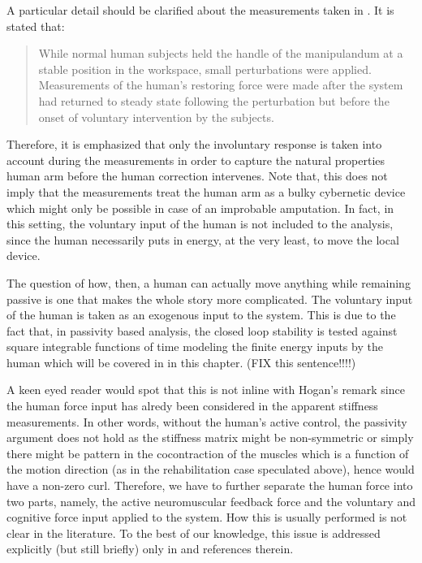 \begin{rem}
A particular detail should be clarified about the measurements taken in \cite{hogan89}. It is stated that: 
\begin{quote}
While normal human subjects held the handle of the manipulandum at a stable position
in the workspace, small perturbations were applied. Measurements
of the human's restoring force were made after the system
had returned to steady state following the perturbation but before
the onset of voluntary intervention by the subjects.
\end{quote}
Therefore, it is emphasized that only the involuntary response is taken into account during the measurements in order to
capture the natural properties human arm before the human correction intervenes. Note that, this does not imply that the
measurements treat the human arm as a bulky cybernetic device which might only be possible in case of an improbable amputation.
In fact, in this setting, the voluntary input of the human is not included to the analysis, since the human necessarily puts in
energy, at the very least, to move the local device. 
\end{rem}

The question of how, then, a human can actually move anything while remaining passive is one that makes the whole 
story more complicated. The voluntary input of the human is taken as an exogenous input to the system. This is due to the 
fact that, in passivity based analysis, the closed loop stability is tested against square integrable functions of time 
modeling the finite energy inputs by the human which will be covered in  in this chapter.  
(FIX this sentence!!!!)

A keen eyed reader would spot that this is not inline with Hogan's remark since the human force input has 
alredy been considered in the apparent stiffness measurements. In other words, without the human's active control, the passivity 
argument does not hold as the stiffness matrix might be non-symmetric or simply there might be pattern in the cocontraction of the muscles 
which is a function of the motion direction (as in the rehabilitation case speculated above), hence would have a non-zero curl. Therefore, 
we have to further separate the human force into two parts, namely, the active neuromuscular feedback force and the voluntary and cognitive force 
input applied to the system. How this is usually performed is not clear in the literature. To the best of our knowledge, this 
issue is addressed explicitly (but still briefly) only in \cite[Sec. II.B]{kazeroonitsay} and references therein.

